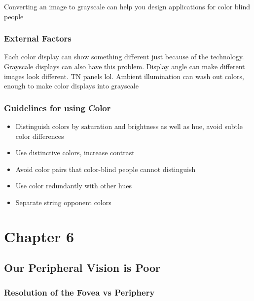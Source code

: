 \documentclass[11pt,]{article}
\providecommand{\tightlist}{%
  \setlength{\itemsep}{0pt}\setlength{\parskip}{0pt}}
\begin{document}
Converting an image to grayscale can help you design applications for
color blind people

\hypertarget{external-factors}{%
\subsubsection{External Factors}\label{external-factors}}

Each color display can show something different just because of the
technology. Grayscale displays can also have this problem. Display angle
can make different images look different. TN panels lol. Ambient
illumination can wash out colors, enough to make color displays into
grayscale

\hypertarget{guidelines-for-using-color}{%
\subsubsection{Guidelines for using
Color}\label{guidelines-for-using-color}}

\begin{itemize}
\tightlist
\item
  Distinguish colors by saturation and brightness as well as hue, avoid
  subtle color differences
\item
  Use distinctive colors, increase contrast
\item
  Avoid color pairs that color-blind people cannot distinguish
\item
  Use color redundantly with other hues
\item
  Separate string opponent colors
\end{itemize}

\hypertarget{chapter-6}{%
\section{Chapter 6}\label{chapter-6}}

\hypertarget{our-peripheral-vision-is-poor}{%
\subsection{Our Peripheral Vision is
Poor}\label{our-peripheral-vision-is-poor}}

\hypertarget{resolution-of-the-fovea-vs-periphery}{%
\subsubsection{Resolution of the Fovea vs
Periphery}\label{resolution-of-the-fovea-vs-periphery}}
\end{document}

